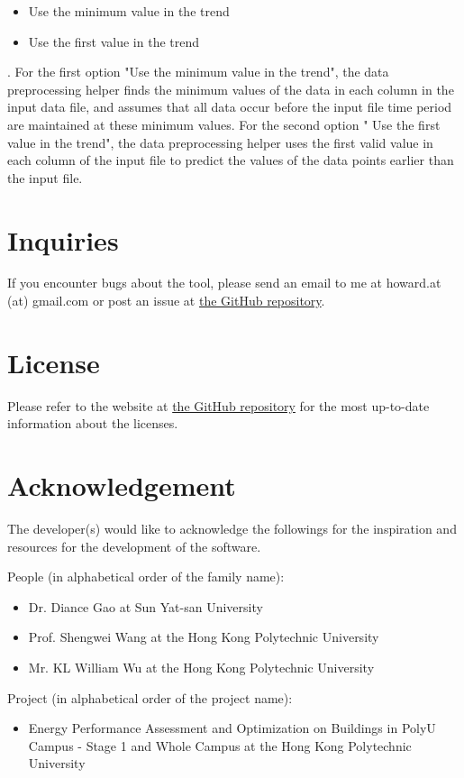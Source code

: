 \documentclass[12pt,a4paper]{article}
\begin{document}
\begin{itemize}
\item Use the minimum value in the trend
\item Use the first value in the trend
\end{itemize}

.
For the first option "Use the minimum value in the trend", the data preprocessing helper finds the minimum values of the data in each column in the input data file, and assumes that all data occur before the input file time period are maintained at these minimum values.
For the second option " Use the first value in the trend", the data preprocessing helper uses the first valid value in each column of the input file to predict the values of the data points earlier than the input file.

\section{Inquiries}

If you encounter bugs about the tool, please send an email to me at howard.at (at) gmail.com or post an issue at \href{https://github.com/howardcheung/data-preprocessing-helper/}{the GitHub repository}.

\section{License}

Please refer to the website at \href{https://github.com/howardcheung/data-preprocessing-helper/}{the GitHub repository} for the most up-to-date information about the licenses.

\section{Acknowledgement}

The developer(s) would like to acknowledge the followings for the inspiration and resources for the development of the software.

People (in alphabetical order of the family name):
\begin{itemize}
\item Dr. Diance Gao at Sun Yat-san University
\item Prof. Shengwei Wang at the Hong Kong Polytechnic University
\item Mr. KL William Wu at the Hong Kong Polytechnic University
\end{itemize}

Project (in alphabetical order of the project name):
\begin{itemize}
\item Energy Performance Assessment and Optimization on Buildings in PolyU Campus - Stage 1 and Whole Campus at the Hong Kong Polytechnic University
\end{itemize}
\end{document}
